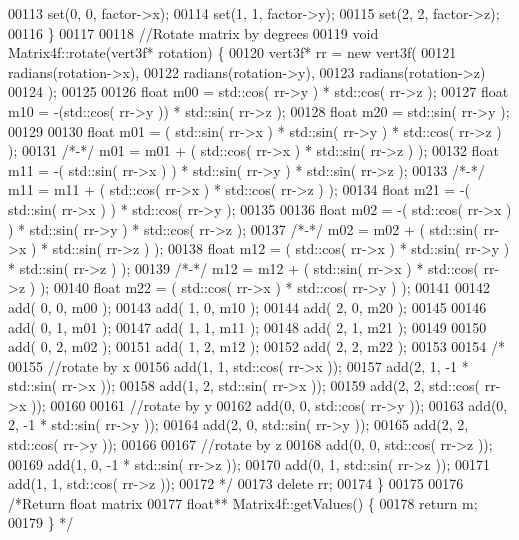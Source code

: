 \begin{DoxyCode}
00113     \textcolor{keyword}{set}(0, 0, factor->x);
00114     \textcolor{keyword}{set}(1, 1, factor->y);
00115     \textcolor{keyword}{set}(2, 2, factor->z);
00116 \}
00117 
00118 \textcolor{comment}{//Rotate matrix by degrees}
00119 \textcolor{keywordtype}{void} Matrix4f::rotate(vert3f* rotation) \{
00120     vert3f* rr = \textcolor{keyword}{new} vert3f( 
00121         radians(rotation->x),
00122         radians(rotation->y),
00123         radians(rotation->z)
00124     );
00125 
00126     \textcolor{keywordtype}{float} m00 =   std::cos( rr->y )  * std::cos( rr->z );
00127     \textcolor{keywordtype}{float} m10 = -(std::cos( rr->y )) * std::sin( rr->z );
00128     \textcolor{keywordtype}{float} m20 =   std::sin( rr->y );
00129     
00130     \textcolor{keywordtype}{float} m01 =  ( std::sin( rr->x ) * std::sin( rr->y ) * std::cos( rr->z ) );
00131     \textcolor{comment}{/*-*/} m01 = m01 + ( std::cos( rr->x ) * std::sin( rr->z ) );
00132     \textcolor{keywordtype}{float} m11 = -( std::sin( rr->x ) ) * std::sin( rr->y ) * std::sin( rr->z );
00133     \textcolor{comment}{/*-*/} m11 = m11 + ( std::cos( rr->x ) * std::cos( rr->z ) );
00134     \textcolor{keywordtype}{float} m21 = -( std::sin( rr->x ) ) * std::cos( rr->y );
00135 
00136     \textcolor{keywordtype}{float} m02 = -( std::cos( rr->x ) ) * std::sin( rr->y ) * std::cos( rr->z );
00137     \textcolor{comment}{/*-*/} m02 = m02 + ( std::sin( rr->x ) * std::sin( rr->z ) );
00138     \textcolor{keywordtype}{float} m12 =  ( std::cos( rr->x ) * std::sin( rr->y ) * std::sin( rr->z ) );
00139     \textcolor{comment}{/*-*/} m12 = m12 + ( std::sin( rr->x ) * std::cos( rr->z ) );
00140     \textcolor{keywordtype}{float} m22 =  ( std::cos( rr->x ) * std::cos( rr->y ) );
00141 
00142     add( 0, 0, m00 );
00143     add( 1, 0, m10 );
00144     add( 2, 0, m20 );
00145    
00146     add( 0, 1, m01 );
00147     add( 1, 1, m11 );
00148     add( 2, 1, m21 );
00149 
00150     add( 0, 2, m02 );
00151     add( 1, 2, m12 );
00152     add( 2, 2, m22 );
00153 
00154     \textcolor{comment}{/*}
00155 \textcolor{comment}{    //rotate by x}
00156 \textcolor{comment}{    add(1, 1,      std::cos( rr->x ));}
00157 \textcolor{comment}{    add(2, 1, -1 * std::sin( rr->x ));}
00158 \textcolor{comment}{    add(1, 2,      std::sin( rr->x ));}
00159 \textcolor{comment}{    add(2, 2,      std::cos( rr->x ));}
00160 \textcolor{comment}{}
00161 \textcolor{comment}{    //rotate by y}
00162 \textcolor{comment}{    add(0, 0,      std::cos( rr->y ));}
00163 \textcolor{comment}{    add(0, 2, -1 * std::sin( rr->y ));}
00164 \textcolor{comment}{    add(2, 0,      std::sin( rr->y ));}
00165 \textcolor{comment}{    add(2, 2,      std::cos( rr->y ));}
00166 \textcolor{comment}{}
00167 \textcolor{comment}{    //rotate by z}
00168 \textcolor{comment}{    add(0, 0,      std::cos( rr->z ));}
00169 \textcolor{comment}{    add(1, 0, -1 * std::sin( rr->z ));}
00170 \textcolor{comment}{    add(0, 1,      std::sin( rr->z ));}
00171 \textcolor{comment}{    add(1, 1,      std::cos( rr->z ));}
00172 \textcolor{comment}{    */}
00173     \textcolor{keyword}{delete} rr;
00174 \}
00175 
00176 \textcolor{comment}{/*Return float matrix}
00177 \textcolor{comment}{float** Matrix4f::getValues() \{}
00178 \textcolor{comment}{    return m;}
00179 \textcolor{comment}{\} */}
\end{DoxyCode}
